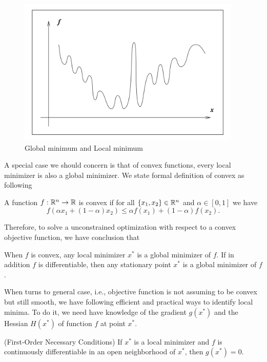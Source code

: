 \documentclass[11pt]{report}
\begin{document}
\begin{figure}[H]
    \centering
    \includegraphics[width=0.95\textwidth]{../images/global_min}
    \caption{Global minimum and Local minimum}
    \label{fig:global_min}
\end{figure}

A special case we should concern is that of convex functions, every local minimizer is also a global minimizer. We state formal definition of convex as following
\begin{definition}
    A function $f: \mathbb{R}^n \rightarrow \mathbb{R}$ is convex if for all $\{x_1,x_2\}\in \mathbb{R}^n$ and $\alpha\in [0,1]$ we have
    \begin{equation}
        f(\alpha x_1 +(1- \alpha)x_2)\leq \alpha f(x_1) +(1- \alpha)f(x_2).
    \end{equation}
\end{definition}

Therefore, to solve a unconstrained optimization with respect to a convex objective function, we have conclusion that
\begin{theorem}
When $f$ is convex, any local minimizer $x^*$ is a global minimizer of $f$. If in addition $f$ is differentiable, then any stationary point $x^*$ is a global minimizer of $f$.
\end{theorem}

When turns to general case, i.e., objective function is not assuming to be convex but still smooth, we have following efficient and practical ways to identify local minima. To do it, we need have knowledge of the gradient $g(x^*)$ and the Hessian $H(x^*)$ of function $f$ at point $x^*$.
\begin{theorem}(First-Order Necessary Conditions)\label{thm:first_order}
    If $x^*$ is a local minimizer and $f$ is continuously differentiable in an open neighborhood of $x^*$, then $g(x^*)=0$.
\end{theorem}
\end{document}

